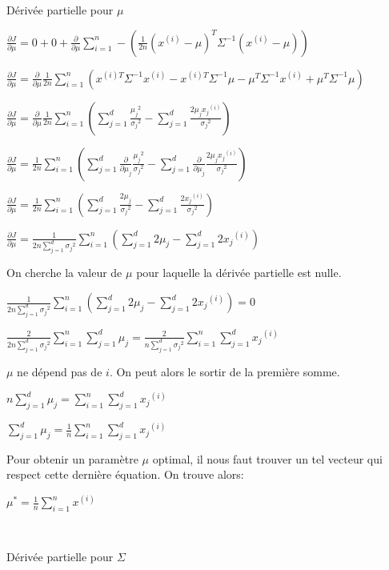 \documentclass[a4paper,10pt]{article}
\begin{document}
Dérivée partielle pour $\mu$

$\frac{\partial J}{\partial \mu} = 0 + 0 + \frac{\partial }{\partial \mu} \sum_{i=1}^{n}  - (\frac{1}{2n} (x^{(i)}- \mu)^{T} \Sigma^{-1} (x^{(i)}- \mu) )$ 

$\frac{\partial J}{\partial \mu}=\frac{\partial }{\partial \mu} \frac{1}{2n} \sum_{i=1}^{n} (x^{(i)T} \Sigma^{-1} x^{(i)} - x^{(i)T} \Sigma^{-1} \mu - \mu^{T}\Sigma^{-1} x^{(i)} + \mu^{T}\Sigma^{-1}\mu)$

$\frac{\partial J}{\partial \mu}=\frac{\partial }{\partial \mu} \frac{1}{2n} \sum_{i=1}^{n} (\sum_{j=1}^{d} \frac{{\mu_j}^2}{{\sigma_j}^2} - \sum_{j=1}^{d} \frac{2 \mu_j {x_j}^{(i)} }{{\sigma_j}^2})$

$\frac{\partial J}{\partial \mu}=\frac{1}{2n} \sum_{i=1}^{n} (\sum_{j=1}^{d} \frac{\partial } {\partial \mu_j} \frac{{\mu_j}^2}{{\sigma_j}^2} - \sum_{j=1}^{d} \frac{\partial }{\partial \mu_j} \frac{2 \mu_j {x_j}^{(i)} }{{\sigma_j}^2})$

$\frac{\partial J}{\partial \mu}=\frac{1}{2n} \sum_{i=1}^{n} (\sum_{j=1}^{d} \frac{2{\mu_j}}{{\sigma_j}^2} - \sum_{j=1}^{d} \frac{2 {x_j}^{(i)} }{{\sigma_j}^2})$

$\frac{\partial J}{\partial \mu}=\frac{1}{2n \sum_{j=1}^{d} {\sigma_j}^2} \sum_{i=1}^{n} (\sum_{j=1}^{d} 2{\mu_j} - \sum_{j=1}^{d} 2 {x_j}^{(i)})$

On cherche la valeur de $\mu$ pour laquelle la dérivée partielle est nulle.

$\frac{1}{2n \sum_{j=1}^{d} {\sigma_j}^2} \sum_{i=1}^{n} (\sum_{j=1}^{d} 2{\mu_j} - \sum_{j=1}^{d} 2 {x_j}^{(i)}) = 0$

$\frac{2}{2n \sum_{j=1}^{d} {\sigma_j}^2} \sum_{i=1}^{n} \sum_{j=1}^{d} {\mu_j} = \frac{2}{n \sum_{j=1}^{d} {\sigma_j}^2} \sum_{i=1}^{n} \sum_{j=1}^{d}  {x_j}^{(i)}$

$\mu$ ne dépend pas de $i$. On peut alors le sortir de la première somme.

$n \sum_{j=1}^{d} {\mu_j} = \sum_{i=1}^{n} \sum_{j=1}^{d}  {x_j}^{(i)}$

$\sum_{j=1}^{d} {\mu_j} = \frac{1}{n} \sum_{i=1}^{n} \sum_{j=1}^{d}  {x_j}^{(i)}$

Pour obtenir un paramètre $\mu$ optimal, il nous faut trouver un tel vecteur qui respect cette dernière équation. On trouve alors:

${\mu}^* = \frac{1}{n} \sum_{i=1}^{n} {x}^{(i)}$

$ {} $

Dérivée partielle pour $\Sigma$
\end{document}
